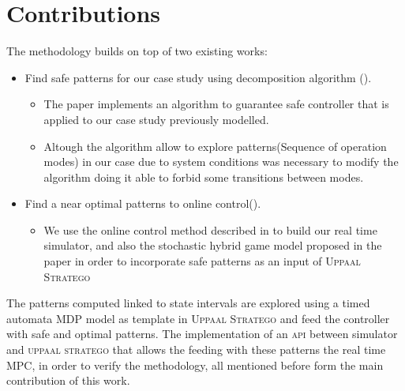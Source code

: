     \section{Contributions}
    \label{sec:contributions}
        The methodology builds on top of two existing works:      
        \begin{itemize}
            \item Find safe patterns for our case study using
            decomposition algorithm (\cite{le2017improved}).
                \begin{itemize}
                    \item The paper \cite{le2017improved} implements an algorithm to guarantee safe 
                    controller that is applied to our case study previously modelled.
                    \item Altough the algorithm allow to explore patterns(Sequence of operation modes) 
                    in our case due to system conditions was necessary to modify the 
                    algorithm doing it able to forbid some transitions between modes.                  
                \end{itemize}
            \item Find a near optimal patterns to online control(\cite{larsen2016online}).
            \begin{itemize}
                \item We use the online control method described in \cite{larsen2016online} to build our real time simulator, and also 
                the stochastic hybrid game model proposed in the paper in order
                to incorporate safe patterns as an input of \textsc{Uppaal Stratego}
            \end{itemize}            
        \end{itemize}
        The patterns computed linked to state intervals are explored using 
        a timed automata \ac{MDP} model as template in \textsc{Uppaal Stratego} and feed the controller 
        with safe and optimal patterns. The implementation of an \textsc{api} between 
        simulator and \textsc{uppaal stratego} that allows the feeding with 
        these patterns the real time \ac{MPC}, in order to verify the methodology, all 
        mentioned before form the main contribution of this work.            

